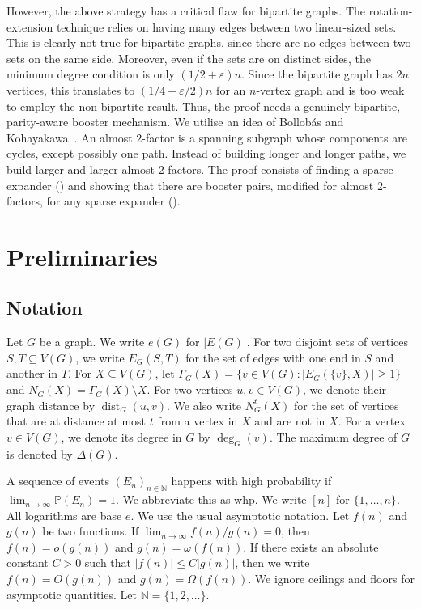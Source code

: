 \documentclass[reqno,final,a4paper]{amsart}
\numberwithin{equation}{section}
\theoremstyle{definition}
\theoremstyle{remark}
\renewcommand{\Pr}{\mathbb{P}}
\newcommand{\eps}{\varepsilon}
\newcommand{\dist}{\operatorname{dist}}
\begin{document}
However, the above strategy has a critical flaw for bipartite graphs.
The rotation-extension technique relies on having many edges between two linear-sized sets. This is clearly not true for bipartite graphs, since there are no edges between two sets on the same side. Moreover, even if the sets are on distinct sides, the minimum degree condition is only $(1/2+\eps)n$. Since the bipartite graph has $2n$ vertices, this translates to $(1/4+\eps/2)n$ for an $n$-vertex graph
and is too weak to employ the non-bipartite result.
Thus, the proof needs a genuinely bipartite, parity-aware booster mechanism. 
We utilise an idea of Bollob\'as and Kohayakawa~\cite{Bollobas-Kohayakawa}. 
An almost $2$-factor is a spanning subgraph whose components are cycles, except possibly one path. 
Instead of building longer and longer paths, we build larger and larger almost $2$-factors.
The proof consists of finding a sparse expander () and showing that there are booster pairs, modified for almost $2$-factors, for any sparse expander (). 

\section{Preliminaries}
\subsection{Notation}
Let $G$ be a graph. 
We write $e(G)$ for $|E(G)|$. For two disjoint sets of vertices $S,T\subseteq V(G)$, we write $E_G(S,T)$ for the set of edges with one end in $S$ and another in $T$.
For $X\subseteq V(G)$, let $\Gamma_G(X) = \{v\in V(G):|E_G(\{v\}, X)|\geq 1\}$ and $N_G(X) = \Gamma_G(X)\setminus X$.
For two vertices $u,v\in V(G)$, we denote their graph distance by $\dist_G(u,v)$.
We also write $N_G^t(X)$ for the set of vertices that are at distance at most $t$ from a vertex in $X$ and are not in $X$. 
For a vertex $v\in V(G)$, we denote its degree in $G$ by $\deg_G(v)$. The maximum degree of $G$ is denoted by $\Delta(G)$.


A sequence of events $(E_n)_{n\in \mathbb N}$ happens with high probability if $\lim_{n\rightarrow \infty}\Pr(E_n) = 1$. We abbreviate this as whp. We write $[n]$ for $\{1,\dots, n\}$. All logarithms are base $e$. We use the usual asymptotic notation. Let $f(n)$ and $g(n)$ be two functions. If $\lim_{n\rightarrow \infty} f(n)/g(n) = 0$, then $f(n) = o(g(n))$ and $g(n) = \omega(f(n))$. If there exists an absolute constant $C>0$ such that $|f(n)|\leq C|g(n)|$, then we write $f(n) = O(g(n))$ and $g(n) = \Omega(f(n))$. We ignore ceilings and floors for asymptotic quantities. Let $\mathbb N = \{1,2,\dots\}$.
\end{document}
